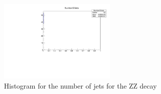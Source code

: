 \documentclass[runningheads,a4paper]{llncs}
\begin{document}
\begin{figure}
\centering
\includegraphics[height=4cm]{NumberOfJets_ZZ}
\caption{Histogram for the number of jets for the ZZ decay}
\label{fig:nojzz}
\end{figure}

%
%
%
%
%
%
%
\end{document}
